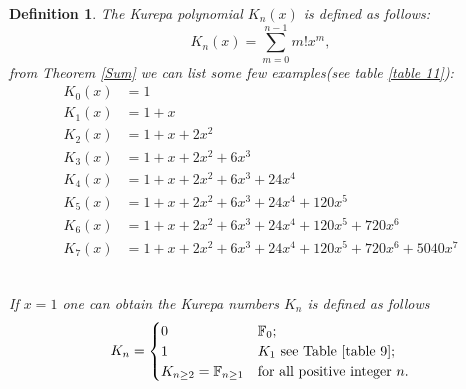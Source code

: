\documentclass[pdflatex,sn-mathphys-num]{sn-jnl}%
\newtheorem{definition}{Definition}
\theoremstyle{thmstyleone}%
\theoremstyle{thmstyletwo}%
\theoremstyle{thmstylethree}%
\begin{document}
\begin{definition} 
    The Kurepa polynomial $K_n(x)$ is defined as follows:
    \begin{equation*}
K_{n}(x)=\sum_{m=0}^{n-1} m!x^m,
 \end{equation*}
 from Theorem \ref{Sum} we can list some few examples(see table \ref{table 11}):
\begin{align}\label{PF}
K_{0}(x) &= 1\\ \nonumber
K_{1}(x) &= 1 + x\\  \nonumber
K_{2}(x) &= 1 + x + 2x^2\\  \nonumber
K_{3}(x) &= 1 + x + 2x^2 + 6x^3\\  \nonumber
K_{4}(x) &= 1 + x + 2x^2 + 6x^3 + 24x^4\\  \nonumber
K_{5}(x) &= 1 + x + 2x^2 + 6x^3 + 24x^4 + 120x^5\\  \nonumber
K_{6}(x) &= 1 + x + 2x^2 + 6x^3 + 24x^4 + 120x^5 + 720x^6\\  \nonumber
K_{7}(x) &= 1 + x + 2x^2 + 6x^3 + 24x^4 + 120x^5 + 720x^6 + 5040x^7
\end{align}
\






 
If $x=1$ one can obtain the Kurepa numbers $K_n$ is defined as follows
    \begin{equation*}
K_n=
\begin{cases}
	\text{0}    & \text{$\mathbb{F}_{0}$;}\\
	\text{$1$} & \text{$K_1$ see Table \ref{table 9}};\\ 
	\text{$K_{n\geq 2}=\mathbb{F}_{n\geq1}$}   & \text{for all positive integer $n$}.
\end{cases}
 \end{equation*} 
\end{definition}
\end{document}
